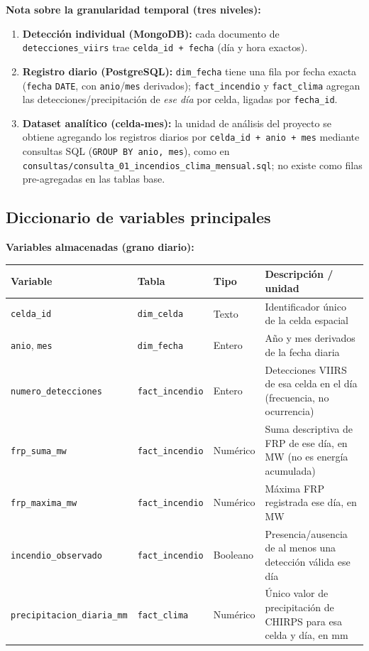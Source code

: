 \documentclass[11pt,a4paper]{article}
\begin{document}
\vspace{0.3cm}
\noindent\textbf{Nota sobre la granularidad temporal (tres niveles):}
\begin{enumerate}
    \item \textbf{Detecci\'on individual (MongoDB):} cada documento de \texttt{detecciones\_viirs} trae \texttt{celda\_id + fecha} (d\'ia y hora exactos).
    \item \textbf{Registro diario (PostgreSQL):} \texttt{dim\_fecha} tiene una fila por fecha exacta (\texttt{fecha} \texttt{DATE}, con \texttt{anio}/\texttt{mes} derivados); \texttt{fact\_incendio} y \texttt{fact\_clima} agregan las detecciones/precipitaci\'on de \emph{ese d\'ia} por celda, ligadas por \texttt{fecha\_id}.
    \item \textbf{Dataset anal\'itico (celda-mes):} la unidad de an\'alisis del proyecto se obtiene agregando los registros diarios por \texttt{celda\_id + anio + mes} mediante consultas SQL (\texttt{GROUP BY anio, mes}), como en \texttt{consultas/consulta\_01\_incendios\_clima\_mensual.sql}; no existe como filas pre-agregadas en las tablas base.
\end{enumerate}

\subsection{Diccionario de variables principales}

\noindent\textbf{Variables almacenadas (grano diario):}

\begin{center}
\footnotesize
\begin{tabular}{@{}L{5.4cm}L{2.1cm}L{1.3cm}L{5.1cm}@{}}
\toprule
\textbf{Variable} & \textbf{Tabla} & \textbf{Tipo} & \textbf{Descripci\'on / unidad} \\
\midrule
\texttt{celda\_id} & \texttt{dim\_celda} & Texto & Identificador \'unico de la celda espacial \\[2pt]
\texttt{anio}, \texttt{mes} & \texttt{dim\_fecha} & Entero & A\~no y mes derivados de la fecha diaria \\[2pt]
\texttt{numero\_detecciones} & \texttt{fact\_incendio} & Entero & Detecciones VIIRS de esa celda en el d\'ia (frecuencia, no ocurrencia) \\[2pt]
\texttt{frp\_suma\_mw} & \texttt{fact\_incendio} & Num\'erico & Suma descriptiva de FRP de ese d\'ia, en MW (no es energ\'ia acumulada) \\[2pt]
\texttt{frp\_maxima\_mw} & \texttt{fact\_incendio} & Num\'erico & M\'axima FRP registrada ese d\'ia, en MW \\[2pt]
\texttt{incendio\_observado} & \texttt{fact\_incendio} & Booleano & Presencia/ausencia de al menos una detecci\'on v\'alida ese d\'ia \\[2pt]
\texttt{precipitacion\_diaria\_mm} & \texttt{fact\_clima} & Num\'erico & \'Unico valor de precipitaci\'on de CHIRPS para esa celda y d\'ia, en mm \\
\bottomrule
\end{tabular}
\end{center}
\end{document}
